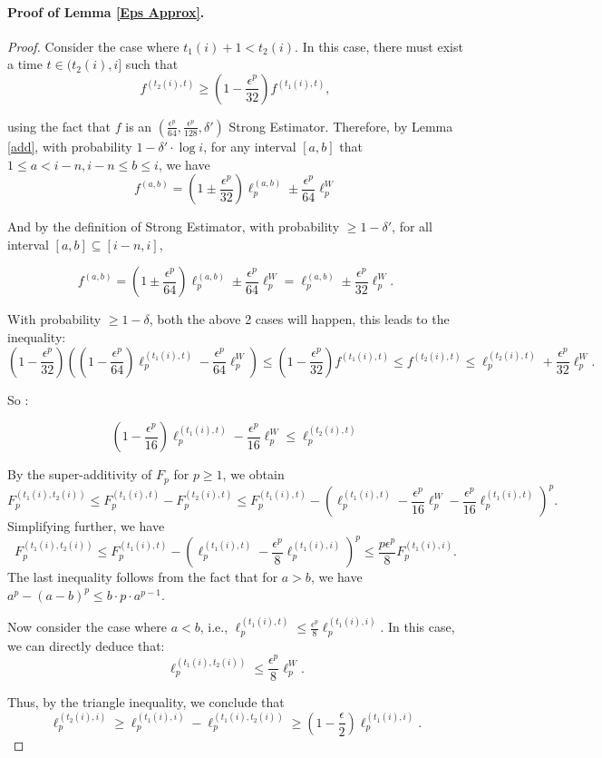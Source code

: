 \documentclass{article}
\newcommand{\estt}{\textsf{Strong Estimator}}
\theoremstyle{plain}
\begin{document}
\paragraph{Proof of Lemma \ref{Eps Approx}.}
\begin{proof}

 Consider the case where \( t_1(i) + 1 < t_2(i) \). In this case, there must exist a time \( t \in (t_2(i), i] \) such that 
    \[
    f^{(t_2(i), t)} \geq \left( 1 - \frac{\epsilon^p}{32} \right) f^{(t_1(i), t)},
    \]
    
    using the fact that \( f \) is an $( \frac {\epsilon ^ p}{64} ,\frac {\epsilon ^ p}{128}, \delta')$ \estt. Therefore, by Lemma \ref{add}, with probability \( 1 - \delta' \cdot \log i \), for any interval \( [a, b] \) that $1 \le a < i - n, i - n\le b \le i$, we have 
    \[
    f^{(a, b)} = \left( 1 \pm \frac{\epsilon^p}{32} \right) \ell_p^{(a, b)} \pm \frac{\epsilon^p}{64} \ell_p^{W}
    \]

    And by the definition of \estt,  with probability $\ge 1 - \delta'$, for all interval $[a, b] \subseteq [i-n,i]$,

    \[
    f^{(a, b)} = \left( 1 \pm \frac{\epsilon^p}{64} \right) \ell_p^{(a, b)} \pm \frac{\epsilon^p}{64} \ell_p^{W}  = \ell_p^{(a, b)} \pm \frac{\epsilon^p}{32} \ell_p^{W}.
    \]
    
    With probability $\ge 1 - \delta$, both the above 2 cases will happen, this leads to the inequality:
    \[
    \left( 1 - \frac{\epsilon^p}{32} \right) \left( (1 - \frac{\epsilon ^ p}{64})\ell_p^{(t_1(i), t)} - \frac{\epsilon^p}{64} \ell_p^{W} \right) \leq \left( 1 - \frac{\epsilon^p}{32} \right) f^{(t_1(i), t)} \leq f^{(t_2(i), t)} \leq \ell_p^{(t_2(i), t)} + \frac{\epsilon^p}{32} \ell_p^{W}.
    \]

    So : 

    \[
(1 - \frac{\epsilon ^ p}{16})\ell_p ^ {(t_1(i), t)} - \frac{\epsilon ^ p}{16} \ell_p ^ W \le  \ell_p^{(t_2(i), t)}
    \]
    
By the super-additivity of \( F_p \) for \( p \geq 1 \), we obtain
\[
F_p^{(t_1(i), t_2(i))} \leq F_p^{(t_1(i), t)} - F_p^{(t_2(i), t)} \leq F_p^{(t_1(i), t)} - \left( \ell_p^{(t_1(i), t)} - \frac{\epsilon^p}{16} \ell_p^{W} - \frac{\epsilon^p}{16} \ell_p^{(t_1(i), t)} \right)^p.
\]
Simplifying further, we have
\[
F_p^{(t_1(i), t_2(i))} \leq F_p^{(t_1(i), t)} - \left( \ell_p^{(t_1(i), t)} - \frac{\epsilon^p}{8} \ell_p^{(t_1(i), i)} \right)^p \leq \frac{p \epsilon^p}{8} F_p^{(t_1(i), i)}.
\]
The last inequality follows from the fact that for \( a > b \), we have \( a^p - (a - b)^p \leq b \cdot p \cdot a^{p-1} \).

Now consider the case where \( a < b \), i.e., \( \ell_p^{(t_1(i), t)} \leq \frac{\epsilon^p}{8} \ell_p^{(t_1(i), i)} \). In this case, we can directly deduce that:
\[
\ell_p^{(t_1(i), t_2(i))} \leq \frac{\epsilon^p}{8} \ell_p^{W}.
\]

Thus, by the triangle inequality, we conclude that
\[
\ell_p^{(t_2(i), i)} \geq \ell_p^{(t_1(i), i)} - \ell_p^{(t_1(i), t_2(i))} \geq \left( 1 - \frac{\epsilon}{2} \right) \ell_p^{(t_1(i), i)}.
\]

\end{proof}
\end{document}
